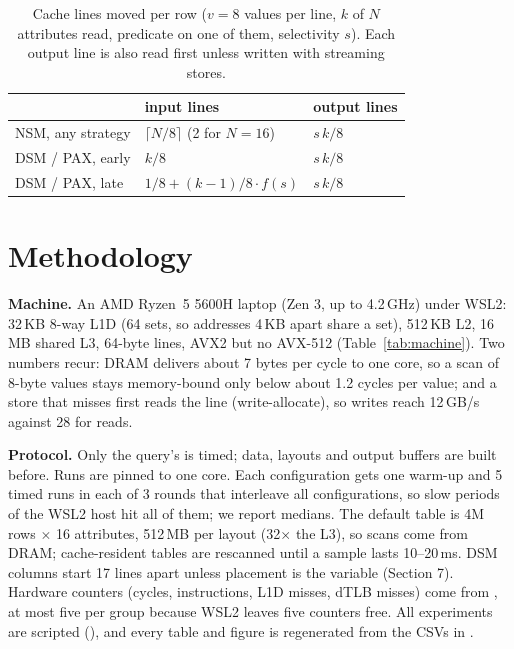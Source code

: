 \begin{table}[t]
\caption{One core of the test machine, measured by our microbenchmark (latency: random pointer
chase; bandwidth: sequential).}
\label{tab:machine}
\small{}
\end{table}

\begin{table}[t]
\caption{Cache lines moved per row ($v{=}8$ values per line, $k$ of $N$ attributes read,
predicate on one of them, selectivity $s$). Each output line is also read first unless written
with streaming stores.}
\label{tab:lines}
\small
\begin{tabular}{lll}
\toprule
 & input lines & output lines \\
\midrule
NSM, any strategy & $\lceil N/8\rceil$ (2 for $N{=}16$) & $s\,k/8$ \\
DSM / PAX, early & $k/8$ & $s\,k/8$ \\
DSM / PAX, late & $1/8 + (k-1)/8 \cdot f(s)$ & $s\,k/8$ \\
\bottomrule
\end{tabular}
\end{table}

\section{Methodology}
\textbf{Machine.} An AMD Ryzen~5 5600H laptop (Zen 3, up to 4.2\,GHz) under WSL2: 32\,KB 8-way
L1D (64 sets, so addresses 4\,KB apart share a set), 512\,KB L2, 16\,MB shared L3, 64-byte lines,
AVX2 but no AVX-512 (Table~\ref{tab:machine}). Two numbers recur: DRAM delivers about 7 bytes
per cycle to one core, so a scan of 8-byte values stays memory-bound only below about 1.2 cycles
per value; and a store that misses first reads the line (write-allocate), so writes reach
12\,GB/s against 28 for reads.

\textbf{Protocol.} Only the query's  is timed; data, layouts and output buffers are
built before. Runs are pinned to one core. Each configuration gets one warm-up and 5 timed runs
in each of 3 rounds that interleave all configurations, so slow periods of the WSL2 host hit all
of them; we report medians. The default table is 4M rows $\times$ 16 attributes, 512\,MB per
layout (32$\times$ the L3), so scans come from DRAM; cache-resident tables are rescanned until a
sample lasts 10--20\,ms. DSM columns start 17 lines apart unless placement is the variable
(Section 7). Hardware counters (cycles, instructions, L1D misses, dTLB misses) come from
, at most five per group because WSL2 leaves five counters free. All
experiments are scripted (), and every table and figure is
regenerated from the CSVs in .
